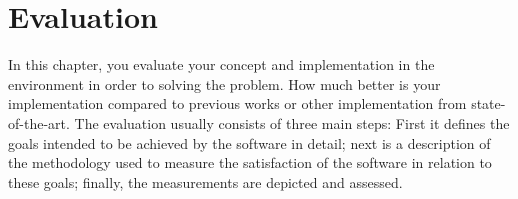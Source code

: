 \chapter{Evaluation}
In this chapter, you evaluate your concept and implementation in the environment in order to solving the problem. How much better is your implementation compared to previous works or other implementation from state-of-the-art. The evaluation usually consists of three main steps:
First it defines the goals intended to be achieved by the software in detail;
next is a description of the methodology
used to measure the satisfaction of the software in relation to these goals;
finally, the measurements are depicted and assessed.
\newpage